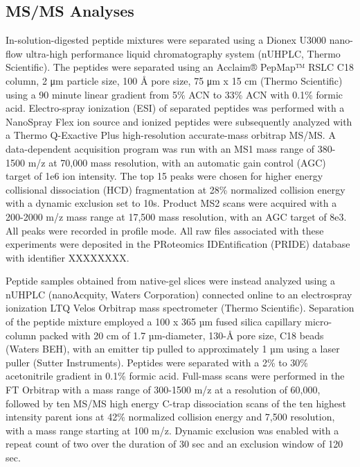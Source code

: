 \subsection{MS/MS Analyses}
	In-solution-digested peptide mixtures were separated using a Dionex U3000 nano-flow ultra-high performance liquid chromatography system (nUHPLC, Thermo Scientific). The peptides were separated using an Acclaim® PepMap™ RSLC C18 column, 2 μm particle size, 100 Å pore size, 75 μm x 15 cm (Thermo Scientific) using a 90 minute linear gradient from 5\% ACN to 33\% ACN with 0.1\% formic acid. Electro-spray ionization (ESI) of separated peptides was performed with a NanoSpray Flex ion source and ionized peptides were subsequently analyzed with a Thermo Q-Exactive Plus high-resolution accurate-mass orbitrap MS/MS. A data-dependent acquisition program was run with an MS1 mass range of 380-1500 m/z at 70,000 mass resolution, with an automatic gain control (AGC) target of 1e6 ion intensity. The top 15 peaks were chosen for higher energy collisional dissociation (HCD) fragmentation at 28\% normalized collision energy with a dynamic exclusion set to 10s. Product MS2 scans were acquired with a 200-2000 m/z mass range at 17,500 mass resolution, with an AGC target of 8e3. All peaks were recorded in profile mode. All raw files associated with these experiments were deposited in the PRoteomics IDEntification (PRIDE) database with identifier XXXXXXXX.

	Peptide samples obtained from native-gel slices were instead analyzed using a nUHPLC (nanoAcquity, Waters Corporation) connected online to an electrospray ionization LTQ Velos Orbitrap mass spectrometer (Thermo Scientific).  Separation of the peptide mixture employed a 100 x 365 µm fused silica capillary micro-column packed with 20 cm of 1.7 µm-diameter, 130-Å pore size, C18 beads (Waters BEH), with an emitter tip pulled to approximately 1 µm using a laser puller (Sutter Instruments).  Peptides were separated with a 2\% to 30\% acetonitrile gradient in 0.1\% formic acid.  Full-mass scans were performed in the FT Orbitrap with a mass range of 300-1500 m/z at a resolution of 60,000, followed by ten MS/MS high energy C-trap dissociation scans of the ten highest intensity parent ions at 42\% normalized collision energy and 7,500 resolution, with a mass range starting at 100 m/z.  Dynamic exclusion was enabled with a repeat count of two over the duration of 30 sec and an exclusion window of 120 sec.

